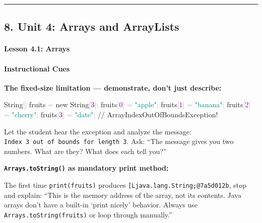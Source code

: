 \documentclass[
  justified,
  openright,
]{tufte-book}
\let\subsubsection\paragraph
\let\paragraph\paragraph
\newcommand{\BuiltInTok}[1]{#1}
\newcommand{\CommentTok}[1]{\textcolor{MidGray}{#1}}
\newcommand{\DecValTok}[1]{\textcolor{Purple}{#1}}
\newcommand{\KeywordTok}[1]{\textcolor{BrandBlue}{#1}}
\newcommand{\NormalTok}[1]{#1}
\newcommand{\OperatorTok}[1]{\textcolor{DarkGray}{#1}}
\newcommand{\StringTok}[1]{\textcolor{Teal}{#1}}
\newenvironment{Shaded}{%
  \begin{snugshade}
}{%
  \end{snugshade}
}
\let\subsubsection\paragraph
\let\paragraph\paragraph
\begin{document}
\begin{center}\rule{0.5\linewidth}{0.5pt}\end{center}

\subsection{8. Unit 4: Arrays and
ArrayLists}\label{unit-4-arrays-and-arraylists}

\subsubsection{Lesson 4.1: Arrays}\label{lesson-4.1-arrays}

\paragraph{Instructional Cues}\label{instructional-cues-5}

\textbf{The fixed-size limitation --- demonstrate, don't just describe:}

\begin{Shaded}
\begin{Highlighting}[]
\BuiltInTok{String}\OperatorTok{[]}\NormalTok{ fruits }\OperatorTok{=} \KeywordTok{new} \BuiltInTok{String}\OperatorTok{[}\DecValTok{3}\OperatorTok{];}
\NormalTok{fruits}\OperatorTok{[}\DecValTok{0}\OperatorTok{]} \OperatorTok{=} \StringTok{"apple"}\OperatorTok{;}
\NormalTok{fruits}\OperatorTok{[}\DecValTok{1}\OperatorTok{]} \OperatorTok{=} \StringTok{"banana"}\OperatorTok{;}
\NormalTok{fruits}\OperatorTok{[}\DecValTok{2}\OperatorTok{]} \OperatorTok{=} \StringTok{"cherry"}\OperatorTok{;}
\NormalTok{fruits}\OperatorTok{[}\DecValTok{3}\OperatorTok{]} \OperatorTok{=} \StringTok{"date"}\OperatorTok{;}   \CommentTok{// ArrayIndexOutOfBoundsException!}
\end{Highlighting}
\end{Shaded}

Let the student hear the exception and analyze the message:
\texttt{Index\ 3\ out\ of\ bounds\ for\ length\ 3}. Ask: ``The message
gives you two numbers. What are they? What does each tell you?''

\textbf{\texttt{Arrays.toString()} as mandatory print method:}

The first time \texttt{print(fruits)} produces
\texttt{{[}Ljava.lang.String;@7a5d012b}, stop and explain: ``This is the
memory address of the array, not its contents. Java arrays don't have a
built-in `print nicely' behavior. Always use
\texttt{Arrays.toString(fruits)} or loop through manually.''
\end{document}
